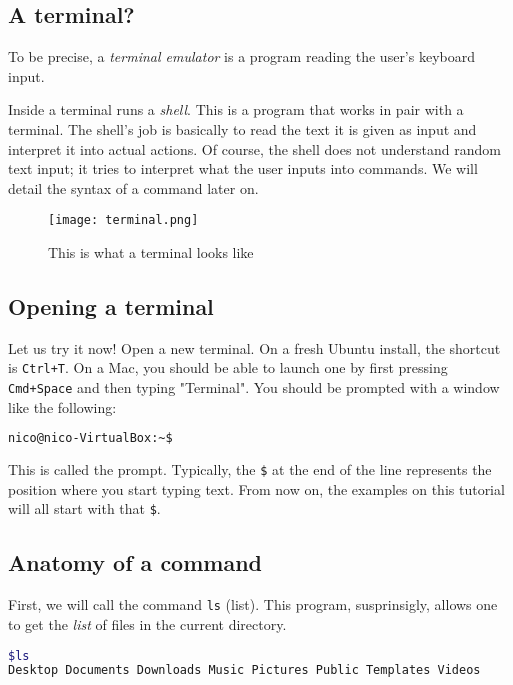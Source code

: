 \documentclass[12pt]{article}
\begin{document}
\subsection{A terminal?}

To be precise, a \textit{terminal emulator} is a program reading the user's keyboard input.

Inside a terminal runs a \textit{shell}. This is a program that works in pair with a terminal. The shell's job is basically to read the text it is given as input and interpret it into actual actions.
Of course, the shell does not understand random text input; it tries to interpret what the user inputs into commands.
We will detail the syntax of a command later on.

\begin{figure}[!h]\centering\captionsetup{}
   \texttt{[image: terminal.png]}
   \caption{This is what a terminal looks like}
\end{figure}

\subsection{Opening a terminal}

Let us try it now! Open a new terminal. On a fresh Ubuntu install, the shortcut is \texttt{Ctrl+T}. On a Mac, you should be able to launch one by first pressing \texttt{Cmd+Space} and then typing "Terminal".
You should be prompted with a window like the following:

\begin{lstlisting}[language=bash]
nico@nico-VirtualBox:~$
\end{lstlisting}

This is called the prompt. Typically, the \texttt{\$} at the end of the line represents the position where you start typing text.
From now on, the examples on this tutorial will all start with that \texttt{\$}.

\subsection{Anatomy of a command}

First, we will call the command \texttt{ls} (list). This program, susprinsigly, allows one to get the \textit{list} of files in the current directory.

\begin{lstlisting}[language=bash]
$ls
Desktop Documents Downloads Music Pictures Public Templates Videos
\end{lstlisting}
\end{document}
